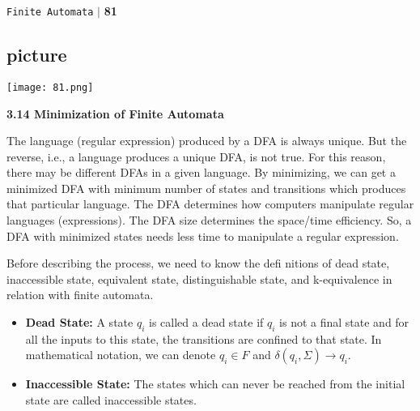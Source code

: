 \documentclass{article}
\begin{document}
\begin{flushright}
 \texttt{Finite Automata} \hspace*{0.1cm}\textbf{$|$} \hspace*{0.1cm} \textbf{81}\hspace*{0.1cm}
\end{flushright}
\vspace*{1cm}

\begin{center}
\section{picture}
\texttt{[image: 81.png]}
\end{center}

\LARGE{\textbf{3.14 Minimization of Finite Automata}}

\vspace*{0.2cm}
\small{The language (regular expression) produced by a DFA is always unique. But the reverse, i.e., a language
produces a unique DFA, is not true. For this reason, there may be different DFAs in a given language.
By minimizing, we can get a minimized DFA with minimum number of states and transitions which
produces that particular language. The DFA determines how computers manipulate regular languages
(expressions). The DFA size determines the space/time efficiency. So, a DFA with minimized states
needs less time to manipulate a regular expression.

\hspace*{0.2cm} Before describing the process, we need to know the defi nitions of dead state, inaccessible state,
equivalent state, distinguishable state, and k-equivalence in relation with finite automata.}

\begin{itemize}
  \item \textbf{Dead State:} A state $q_i$ is called a dead state if $q_i$ is not a final state and for all the inputs to this
state, the transitions are confined to that state. In mathematical notation, we can denote $q_i \in  F$ and
$\delta(q_i, \Sigma) \rightarrow q_i$.
  \item \textbf{Inaccessible State:} The states which can never be reached from the initial state are called inaccessible
states.
\end{itemize}
\end{document}
